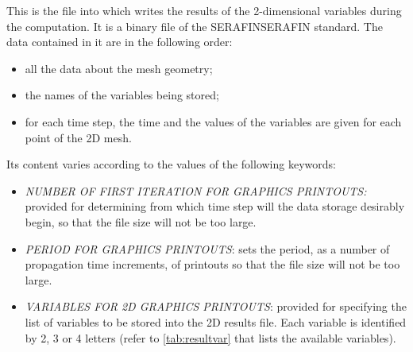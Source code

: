  This is the file into which \tomawac writes the results of the 2-dimensional variables during the computation. It is a binary file of the SERAFINSERAFIN standard. The data contained in it are in the following order:

\begin{itemize}
\item  all the data about the mesh geometry;
\item  the names of the variables being stored;
\item  for each time step, the time and the values of the variables are given for each point of the 2D mesh.
\end{itemize}

 Its content varies according to the values of the following keywords:

\begin{itemize}
\item  \textit{NUMBER OF FIRST ITERATION FOR GRAPHICS PRINTOUTS:} provided for determining from which time step will the data storage desirably begin, so that the file size will not be too large.
\item  \textit{PERIOD FOR GRAPHICS PRINTOUTS}: sets the period, as a number of propagation time increments, of printouts so that the file size will not be too large.
\item  \textit{VARIABLES FOR 2D GRAPHICS PRINTOUTS}: provided for specifying the list of variables to be stored into the 2D results file. Each variable is identified by 2, 3 or 4 letters (refer to \ref{tab:resultvar} that lists the available variables).
\end{itemize}

